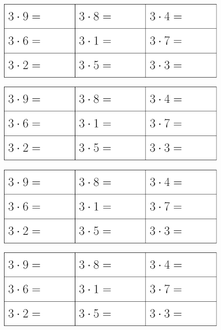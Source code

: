 

\renewcommand{\vs}{\vspace{40pt}}

	 \thispagestyle{empty}
\begin{figure}
	\includegraphics[]{g3}
\end{figure}
\vs
\begin{figure}
	\includegraphics[]{g3}
\end{figure}		
\vs
\begin{figure}
\includegraphics[]{g3}
\end{figure}
\vs
\begin{figure}
	\includegraphics[]{g3}
\end{figure}	
